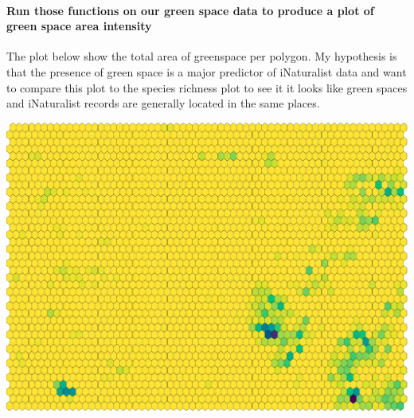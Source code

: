 \documentclass[
]{article}
\newenvironment{Shaded}{\begin{snugshade}}{\end{snugshade}}
\newcommand{\ControlFlowTok}[1]{\textcolor[rgb]{0.13,0.29,0.53}{\textbf{#1}}}
\newcommand{\DataTypeTok}[1]{\textcolor[rgb]{0.13,0.29,0.53}{#1}}
\newcommand{\DecValTok}[1]{\textcolor[rgb]{0.00,0.00,0.81}{#1}}
\newcommand{\FloatTok}[1]{\textcolor[rgb]{0.00,0.00,0.81}{#1}}
\newcommand{\KeywordTok}[1]{\textcolor[rgb]{0.13,0.29,0.53}{\textbf{#1}}}
\newcommand{\NormalTok}[1]{#1}
\newcommand{\OperatorTok}[1]{\textcolor[rgb]{0.81,0.36,0.00}{\textbf{#1}}}
\newcommand{\OtherTok}[1]{\textcolor[rgb]{0.56,0.35,0.01}{#1}}
\newcommand{\StringTok}[1]{\textcolor[rgb]{0.31,0.60,0.02}{#1}}
\begin{document}
\hypertarget{run-those-functions-on-our-green-space-data-to-produce-a-plot-of-green-space-area-intensity}{%
\paragraph{Run those functions on our green space data to produce a plot
of green space area
intensity}\label{run-those-functions-on-our-green-space-data-to-produce-a-plot-of-green-space-area-intensity}}

The plot below show the total area of greenspace per polygon. My
hypothesis is that the presence of green space is a major predictor of
iNaturalist data and want to compare this plot to the species richness
plot to see it it looks like green spaces and iNaturalist records are
generally located in the same places.

\begin{Shaded}
\end{Shaded}

\includegraphics{Earth_Lab_application_files/figure-latex/unnamed-chunk-15-1.pdf}
\end{document}
